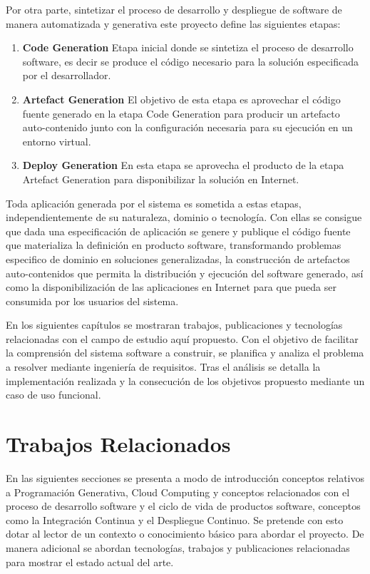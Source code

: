 \documentclass[a4paper,11pt]{book}
\begin{document}
Por otra parte, sintetizar el proceso de desarrollo y despliegue de software de manera automatizada y generativa  este proyecto define las siguientes etapas: 

\begin{enumerate}
\item \textbf{ Code Generation }  Etapa inicial donde se sintetiza el proceso de desarrollo software, es decir se produce el código necesario para la solución especificada por el desarrollador.
\item \textbf{ Artefact Generation }  El objetivo de esta etapa es aprovechar el código fuente generado en la etapa Code Generation para producir un artefacto auto-contenido junto con la configuración necesaria para su ejecución en un entorno virtual.
\item \textbf{ Deploy Generation } En esta etapa se aprovecha el producto de la etapa Artefact Generation para disponibilizar la solución en Internet.
\end{enumerate}

Toda aplicación generada por el sistema es sometida a estas etapas, independientemente de su naturaleza, dominio o tecnología. Con ellas se consigue que dada una especificación de aplicación se genere y publique el código fuente que materializa la definición en producto software, transformando problemas especifico de dominio en soluciones generalizadas, la construcción de artefactos auto-contenidos que permita la distribución y ejecución del software generado, así como la disponibilización de  las aplicaciones en Internet para que pueda ser consumida por los usuarios del sistema. 


En los siguientes capítulos se mostraran trabajos, publicaciones y tecnologías relacionadas con el campo de estudio aquí propuesto. Con el objetivo de facilitar la comprensión del sistema software a construir, se planifica y analiza el problema  a resolver mediante ingeniería de requisitos. Tras el análisis se detalla la implementación realizada y la consecución de los objetivos propuesto mediante un caso de uso funcional.


\chapter{Trabajos Relacionados}

En las siguientes secciones se presenta a modo de introducción conceptos relativos a Programación Generativa, Cloud Computing y conceptos relacionados con el proceso de desarrollo software y el ciclo de vida de productos software, conceptos como la Integración Continua y el Despliegue Continuo. Se pretende con esto dotar al lector de un contexto o conocimiento básico para abordar el proyecto. De manera adicional se abordan tecnologías, trabajos y publicaciones relacionadas para mostrar el estado actual del arte. 
\end{document}
